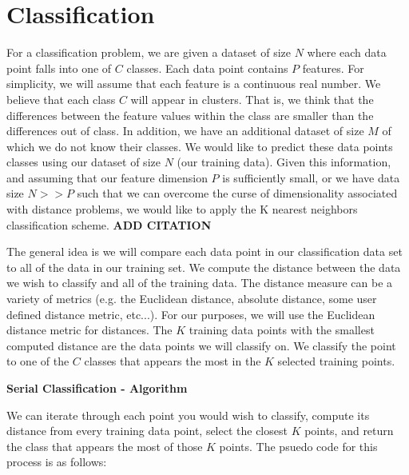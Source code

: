 \section{Classification}

\vspace{5 mm}
\noindent
For a classification problem, we are given a dataset of size $N$ where each 
data point falls into one of $C$ classes. Each data point contains $P$ features. 
For simplicity, we will assume that each feature is a continuous real number. 
We believe that each class $C$ will appear in clusters. That is, we think that 
the differences between the feature values within the class are smaller than 
the differences out of class. In addition, we have an additional dataset of 
size $M$ of which we do not know their classes. We would like to predict these 
data points classes using our dataset of size $N$ (our training data). Given 
this information, and assuming that our feature dimension $P$ is sufficiently 
small, or we have data size $N >> P$ such that we can overcome the curse of 
dimensionality associated with distance problems, we would like to apply the 
K nearest neighbors classification scheme.
\textbf{ADD CITATION}

\vspace{5 mm}
\noindent
The general idea is we will compare each data point in our classification data 
set to all of the data in our training set. We compute the distance between 
the data we wish to classify and all of the training data. The distance measure 
can be a variety of metrics (e.g. the Euclidean distance, absolute distance, 
some user defined distance metric, etc...). For our purposes, we will use the 
Euclidean distance metric for distances. The $K$ training data points with the 
smallest computed distance are the data points we will classify on. We classify 
the point to one of the $C$ classes that appears the most in the $K$ selected 
training points.

\vspace{5 mm}
\noindent
\textbf{Serial Classification - Algorithm}

\vspace{5 mm}
\noindent
We can iterate through each point you would wish to classify, compute its 
distance from every training data point, select the closest $K$ points, and 
return the class that appears the most of those $K$ points. The psuedo code for 
this process is as follows:

\newpage

